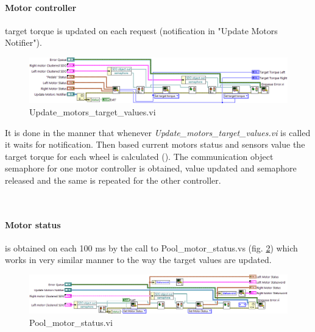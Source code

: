 \paragraph{Motor controller} target torque is updated on each request (notification in "Update Motors Notifier"). 
\begin{figure}[H]
    \centering
    \includegraphics[scale=\visc,max width=\textwidth]{figures/Update_motors_target_valuesd}
    \caption{Update\_motors\_target\_values.vi}
    \label{vi:Update_motors_target_values}
\end{figure}
It is done in the manner that whenever \textit{Update\_motors\_target\_values.vi} is called it waits for notification. Then based current motors status and sensors value the target torque for each wheel is calculated (). The communication object semaphore for one motor controller is obtained, value updated and semaphore released and the same is repeated for the other controller.

\\

\paragraph{Motor status} is obtained on each 100 ms by the call to Pool\_motor\_status.vs (fig. \ref{vi:Pool_motor_statusd}) which works in very similar manner to the way the target values are updated.
\begin{figure}[H]
    \centering
    \includegraphics[scale=\visc,max width=\textwidth]{figures/Pool_motor_statusd}
    \caption{Pool\_motor\_status.vi}
    \label{vi:Pool_motor_statusd}
\end{figure}

